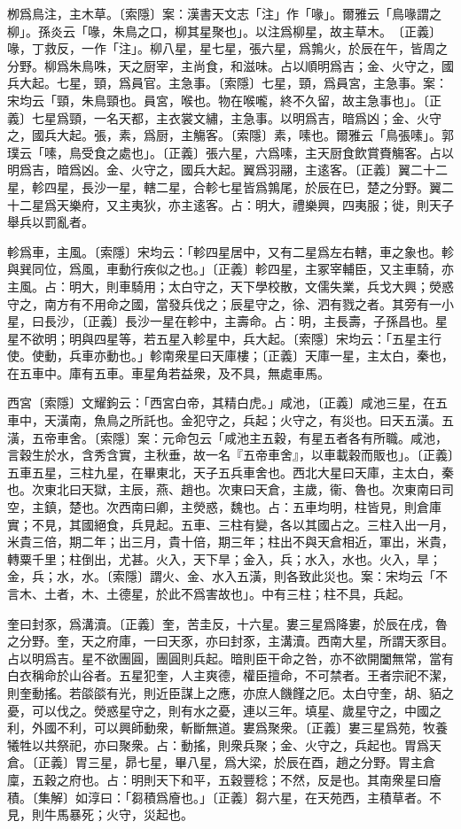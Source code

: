 栁爲鳥注，主木草。〔索隱〕案：漢書天文志「注」作「喙」。爾雅云「鳥喙謂之柳」。孫炎云「喙，朱鳥之口，柳其星聚也」。以注爲柳星，故主草木。　〔正義〕喙，丁救反，一作「注」。柳八星，星七星，張六星，爲鶉火，於辰在午，皆周之分野。柳爲朱鳥咮，天之厨宰，主尚食，和滋味。占以順明爲吉；金、火守之，國兵大起。七星，頸，爲員官。主急事。〔索隱〕七星，頸，爲員宮，主急事。案：宋均云「頸，朱鳥頸也。員宮，喉也。物在喉嚨，終不久留，故主急事也」。〔正義〕七星爲頸，一名天都，主衣裳文繡，主急事。以明爲吉，暗爲凶；金、火守之，國兵大起。張，素，爲厨，主觴客。〔索隱〕素，嗉也。爾雅云「鳥張嗉」。郭璞云「嗉，鳥受食之處也」。〔正義〕張六星，六爲嗉，主天厨食飲賞賚觴客。占以明爲吉，暗爲凶。金、火守之，國兵大起。翼爲羽翮，主逺客。〔正義〕翼二十二星，軫四星，長沙一星，轄二星，合軫七星皆爲鶉尾，於辰在巳，楚之分野。翼二十二星爲天樂府，又主夷狄，亦主逺客。占：明大，禮樂興，四夷服；徙，則天子舉兵以罰亂者。

軫爲車，主風。〔索隱〕宋均云：「軫四星居中，又有二星爲左右轄，車之象也。軫與巽同位，爲風，車動行疾似之也。」〔正義〕軫四星，主冢宰輔臣，又主車騎，亦主風。占：明大，則車騎用；太白守之，天下學校散，文儒失業，兵戈大興；熒惑守之，南方有不用命之國，當發兵伐之；辰星守之，徐、泗有戮之者。其旁有一小星，曰長沙，〔正義〕長沙一星在軫中，主壽命。占：明，主長壽，子孫昌也。星星不欲明；明與四星等，若五星入軫星中，兵大起。〔索隱〕宋均云：「五星主行使。使動，兵車亦動也。」軫南衆星曰天庫樓；〔正義〕天庫一星，主太白，秦也，在五車中。庫有五車。車星角若益衆，及不具，無處車馬。

西宮〔索隱〕文耀鉤云：「西宮白帝，其精白虎。」咸池，〔正義〕咸池三星，在五車中，天潢南，魚鳥之所託也。金犯守之，兵起；火守之，有災也。曰天五潢。五潢，五帝車舍。〔索隱〕案：元命包云「咸池主五穀，有星五者各有所職。咸池，言穀生於水，含秀含實，主秋垂，故一名『五帝車舍』，以車載穀而販也」。〔正義〕五車五星，三柱九星，在畢東北，天子五兵車舍也。西北大星曰天庫，主太白，秦也。次東北曰天獄，主辰，燕、趙也。次東曰天倉，主歲，衞、魯也。次東南曰司空，主鎮，楚也。次西南曰卿，主熒惑，魏也。占：五車均明，柱皆見，則倉庫實；不見，其國絕食，兵見起。五車、三柱有變，各以其國占之。三柱入出一月，米貴三倍，期二年；出三月，貴十倍，期三年；柱出不與天倉相近，軍出，米貴，轉粟千里；柱倒出，尤甚。火入，天下旱；金入，兵；水入，水也。火入，旱；金，兵；水，水。〔索隱〕謂火、金、水入五潢，則各致此災也。案：宋均云「不言木、土者，木、土德星，於此不爲害故也」。中有三柱；柱不具，兵起。

奎曰封豕，爲溝瀆。〔正義〕奎，苦圭反，十六星。婁三星爲降婁，於辰在戌，魯之分野。奎，天之府庫，一曰天豕，亦曰封豕，主溝瀆。西南大星，所謂天豕目。占以明爲吉。星不欲團圓，團圓則兵起。暗則臣干命之咎，亦不欲開闔無常，當有白衣稱命於山谷者。五星犯奎，人主爽德，權臣擅命，不可禁者。王者宗祀不潔，則奎動搖。若燄燄有光，則近臣謀上之應，亦庶人饑饉之厄。太白守奎，胡、貊之憂，可以伐之。熒惑星守之，則有水之憂，連以三年。填星、歲星守之，中國之利，外國不利，可以興師動衆，斬斷無道。婁爲聚衆。〔正義〕婁三星爲苑，牧養犧牲以共祭祀，亦曰聚衆。占：動搖，則衆兵聚；金、火守之，兵起也。胃爲天倉。〔正義〕胃三星，昴七星，畢八星，爲大梁，於辰在酉，趙之分野。胃主倉廩，五穀之府也。占：明則天下和平，五穀豐稔；不然，反是也。其南衆星曰廥積。〔集解〕如淳曰：「芻積爲廥也。」〔正義〕芻六星，在天苑西，主積草者。不見，則牛馬暴死；火守，災起也。

